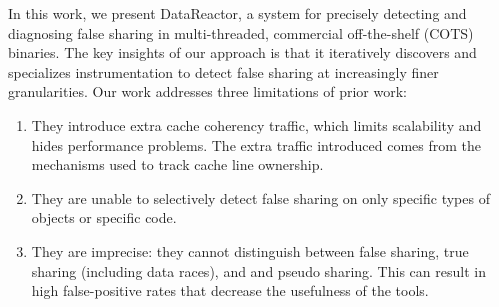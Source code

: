 \documentclass{sig-alternate}
\newcommand{\Toolname}{DataReactor}
\begin{document}
In this work, we present \Toolname{}, a system for precisely detecting and diagnosing false sharing
in multi-threaded, commercial off-the-shelf (COTS) binaries. The key insights of our approach is that
it iteratively discovers and specializes instrumentation to detect false sharing at increasingly finer
granularities. Our work addresses three limitations of prior work:
\begin{enumerate}
\item They introduce extra cache coherency traffic, which limits scalability and hides performance
problems. The extra traffic introduced comes from the mechanisms used to track cache line ownership.

\item They are unable to selectively detect false sharing on only specific types of objects or specific
code.

\item They are imprecise: they cannot distinguish between false sharing, true sharing (including
data races), and and pseudo sharing. This can result in high false-positive rates that decrease the
usefulness of the tools.

\end{enumerate}
\end{document}
